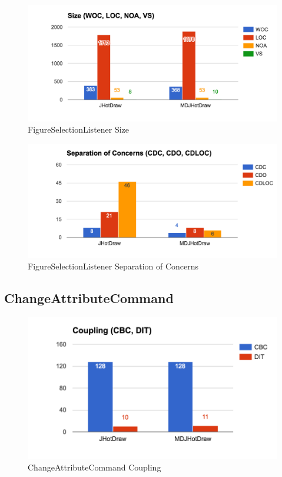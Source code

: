 \begin{figure}[H]
	\centering
	\includegraphics[scale=0.81]{figures/metrics/Metric_Observer_Size.png}
	\caption{FigureSelectionListener Size}
  	\label{fig:FigureSelectionListener Size}
\end{figure}

\begin{figure}[H]
	\centering
	\includegraphics[scale=0.81]{figures/metrics/Metric_Observer_SoC.png}
	\caption{FigureSelectionListener Separation of Concerns}
  	\label{fig:FigureSelectionListener SoC}
\end{figure}

\subsection{ChangeAttributeCommand}

\begin{figure}[H]
	\centering
	\includegraphics[scale=0.82]{figures/metrics/Metric_Undo_Coupling.png}
	\caption{ChangeAttributeCommand Coupling}
  	\label{fig:ChangeAttributeCommand Coupling}
\end{figure}

